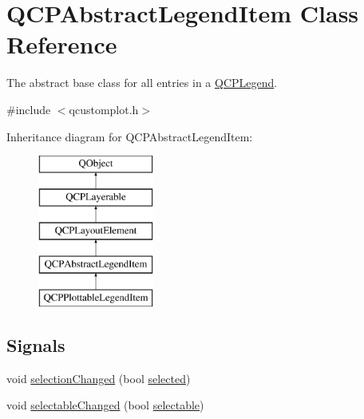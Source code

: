 \hypertarget{class_q_c_p_abstract_legend_item}{}\section{Q\+C\+P\+Abstract\+Legend\+Item Class Reference}
\label{class_q_c_p_abstract_legend_item}


The abstract base class for all entries in a \hyperlink{class_q_c_p_legend}{Q\+C\+P\+Legend}.  




{\ttfamily \#include $<$qcustomplot.\+h$>$}

Inheritance diagram for Q\+C\+P\+Abstract\+Legend\+Item\+:\begin{figure}[H]
\begin{center}
\leavevmode
\includegraphics[height=5.000000cm]{class_q_c_p_abstract_legend_item}
\end{center}
\end{figure}
\subsection*{Signals}
\begin{DoxyCompactItemize}
\item 
void \hyperlink{class_q_c_p_abstract_legend_item_a7cb61fdfbaf69c590bacb8f9e7099d9e}{selection\+Changed} (bool \hyperlink{class_q_c_p_abstract_legend_item_ac776e68e3367704452131c6aa9908bb9}{selected})
\item 
void \hyperlink{class_q_c_p_abstract_legend_item_abc4d779b938cc9235f9196737dbaa6bd}{selectable\+Changed} (bool \hyperlink{class_q_c_p_abstract_legend_item_a0a0205f33f37edae50826c24cb8f1983}{selectable})
\end{DoxyCompactItemize}
